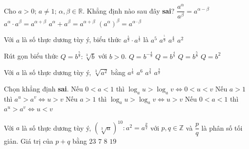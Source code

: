 \begin{ex}%
	Cho $a>0; \,a  \neq 1;\, \alpha, \beta \in \mathbb{R}$. Khẳng định nào sau đây \textbf{sai}?
	 \choice
		{$\dfrac{a^\alpha}{a^\beta}=a^{\alpha-\beta}$} 
		{$a^\alpha \cdot a^\beta=a^{\alpha+\beta}$} 
		{\True  $a^\alpha+a^\beta=a^{\alpha+\beta}$}
		 {$\left(a^\alpha\right)^\beta=a^{\alpha\cdot \beta}$}
\end{ex}

\begin{ex}%
	 Với $a$ là số thực dương tùy ý, biểu thức $a^{\frac{5}{3}}\cdot a^{\frac{1}{3}}$ là
	 \choice
		{$a^5$} 
		{$a^{\frac{^5}{9}}$} 
		 {$a^{\frac{4}{3}}$}
		{\True  $a^2$}
\end{ex}

\begin{ex}%
	Rút gọn biểu  thức $Q=b^{\frac{5}{3}}:\sqrt[3]b$ với $b>0$.
	 \choice
		 {$Q=b^{-\frac{4}{3}}$}
		 {\True $Q=b^{\frac{4}{3}}$}
		{$Q=b^{\frac{5}{9}}$} 
		{$Q=b^2$} 
\end{ex}

\begin{ex}%
	Với $a$ là số thực dương  tùy ý, $\sqrt[3]{a^2}$ bằng
	\choice 
		{$a^{\frac{1}{6}}$} 
		 {$a^6$}
		 {\True $a^{\frac{2}{3}}$}
		{$a^{\frac{3}{2}}$} 
\end{ex}

\begin{ex}%
	Chọn khẳng định \textbf{sai}. 
	\choice 
		{Nếu $0<a<1$ thì $\log_a u>\log_a v \Leftrightarrow  0<u<v$}
		{Nếu $a>1$  thì $a^u >a^v \Leftrightarrow u>v$}
		{\True Nếu $a>1$ thì $\log_a u>\log_a v \Leftrightarrow u>v$} 
		{Nếu  $0<a<1$ thì $a^u >a^v \Leftrightarrow u<v$}
\end{ex}

\begin{ex}%
	Với $a$ là số thực dương tùy ý, $(\sqrt[3]{a})^{10}: a^2=a^{\tfrac{p}{q}}$ với $p, q  \in \mathbb{Z}$ và $\dfrac{p}{q}$ là phân số tối giản. Giá trị của $p+q$ bằng
	\choice 
		 {$23$}
		{\True  $7$}
		 {$8$}
		{$19$} 
\end{ex}

